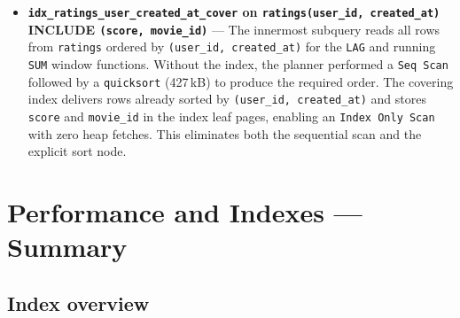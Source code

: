 \documentclass[11pt, a4paper]{article}
\begin{document}
\begin{itemize}
    \item \textbf{\texttt{idx\_ratings\_user\_created\_at\_cover} on
    \texttt{ratings(user\_id, created\_at)} INCLUDE \texttt{(score,
    movie\_id)}} ---
    The innermost subquery reads all rows from \texttt{ratings} ordered by
    \texttt{(user\_id, created\_at)} for the \texttt{LAG} and running
    \texttt{SUM} window functions. Without the index, the planner performed
    a \texttt{Seq Scan} followed by a \texttt{quicksort} (427\,kB) to
    produce the required order. The covering index delivers rows already
    sorted by \texttt{(user\_id, created\_at)} and stores \texttt{score}
    and \texttt{movie\_id} in the index leaf pages, enabling an
    \texttt{Index Only Scan} with zero heap fetches. This eliminates both
    the sequential scan and the explicit sort node.
\end{itemize}

\newpage
\section{Performance and Indexes --- Summary}
\label{sec:performance}

\subsection{Index overview}
\end{document}

